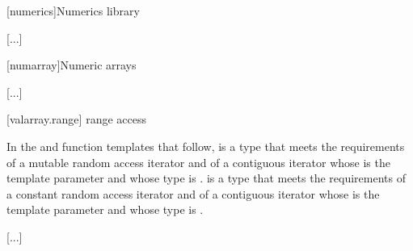 
[numerics]{Numerics library}

[...]

\setcounter{section}{7}
[numarray]{Numeric arrays}

[...]

\setcounter{subsection}{9}
[valarray.range]{ range access}


\pnum
In the  and  function templates that follow, 
is a type that meets the requirements of a mutable random access
iterator
and of a contiguous iterator
whose  is the template
parameter  and whose  type is .  is a
type that meets the requirements of a constant random access
iterator
and of a contiguous iterator
whose  is the template
parameter  and whose  type is .

[...]
